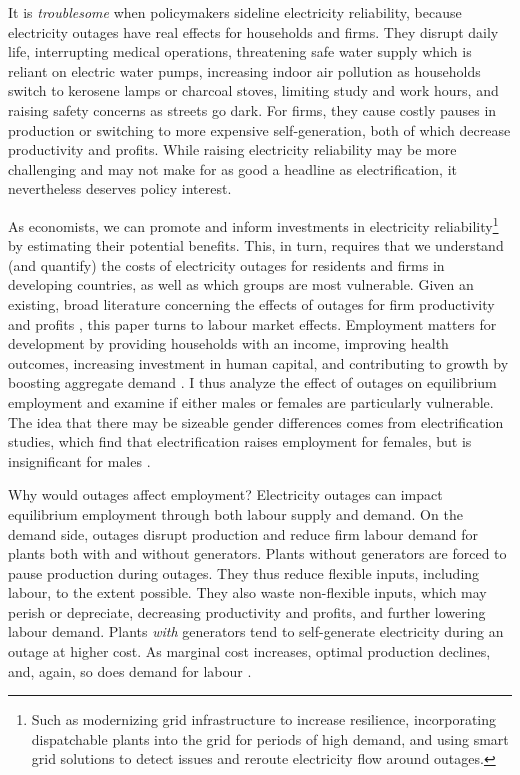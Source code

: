 \documentclass[12pt]{article}
\begin{document}
\par
It is \textit{troublesome} when policymakers sideline electricity reliability, because electricity outages have real effects for households and firms. They disrupt daily life, interrupting medical operations, threatening safe water supply which is reliant on electric water pumps, increasing indoor air pollution as households switch to kerosene lamps or charcoal stoves, limiting study and work hours, and raising safety concerns as streets go dark. For firms, they cause costly pauses in production or switching to more expensive self-generation, both of which decrease productivity and profits. While raising electricity reliability may be more challenging and may not make for as good a headline as electrification, it nevertheless deserves policy interest. 
\par
As economists, we can promote and inform investments in electricity reliability\footnote{Such as modernizing grid infrastructure to increase resilience, incorporating dispatchable plants into the grid for periods of high demand, and using smart grid solutions to detect issues and reroute electricity flow around outages.} by estimating their potential benefits. This, in turn, requires that we understand (and quantify) the costs of electricity outages for residents and firms in developing countries, as well as which groups are most vulnerable. Given an existing, broad literature concerning the effects of outages for firm productivity and profits \cite{abeberese2019a} \cite{alam2013a} \cite{hardy2019a} \cite{allcott2016a}, this paper turns to labour market effects. Employment matters for development by providing households with an income, improving health outcomes, increasing investment in human capital, and contributing to growth by boosting aggregate demand \cite{banerjee2007a}. I thus analyze the effect of outages on equilibrium employment and examine if either males or females are particularly vulnerable. The idea that there may be sizeable gender differences comes from electrification studies, which find that electrification raises employment for females, but is insignificant for males \cite{dasso2015a} \cite{dinkelman2011a} \cite{grogan2013a}.
\par
Why would outages affect employment? Electricity outages can impact equilibrium employment through both labour supply and demand. On the demand side, outages disrupt production and reduce firm labour demand for plants both with and without generators. Plants without generators are forced to pause production during outages. They thus reduce flexible inputs, including labour, to the extent possible. They also waste non-flexible inputs, which may perish or depreciate, decreasing productivity and profits, and further lowering labour demand. Plants \textit{with} generators tend to self-generate electricity during an outage at higher cost. As marginal cost increases, optimal production declines, and, again, so does demand for labour \cite{allcott2016a}.
\end{document}
